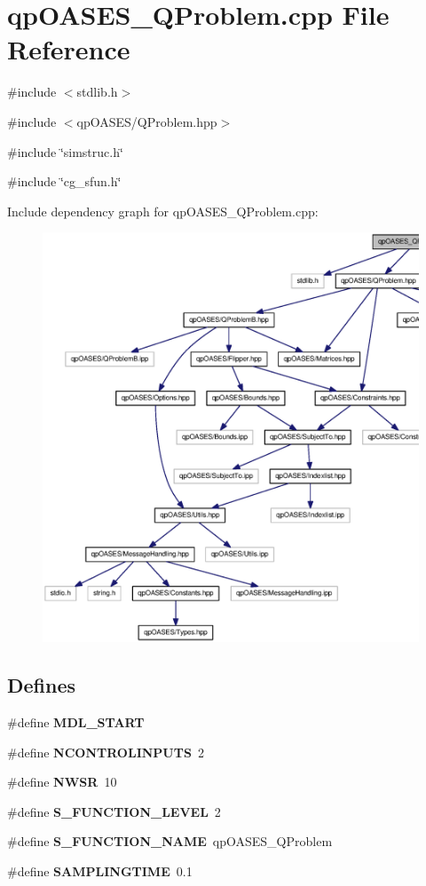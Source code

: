 \section{qpOASES\_\-QProblem.cpp File Reference}
\label{qpOASES__QProblem_8cpp}
{\ttfamily \#include $<$stdlib.h$>$}\par
{\ttfamily \#include $<$qpOASES/QProblem.hpp$>$}\par
{\ttfamily \#include \char`\"{}simstruc.h\char`\"{}}\par
{\ttfamily \#include \char`\"{}cg\_\-sfun.h\char`\"{}}\par
Include dependency graph for qpOASES\_\-QProblem.cpp:
\nopagebreak
\begin{figure}[H]
\begin{center}
\leavevmode
\includegraphics[width=400pt]{qpOASES__QProblem_8cpp__incl}
\end{center}
\end{figure}
\subsection*{Defines}
\begin{DoxyCompactItemize}
\item 
\#define {\bf MDL\_\-START}
\item 
\#define {\bf NCONTROLINPUTS}~2
\item 
\#define {\bf NWSR}~10
\item 
\#define {\bf S\_\-FUNCTION\_\-LEVEL}~2
\item 
\#define {\bf S\_\-FUNCTION\_\-NAME}~qpOASES\_\-QProblem
\item 
\#define {\bf SAMPLINGTIME}~0.1
\end{DoxyCompactItemize}
